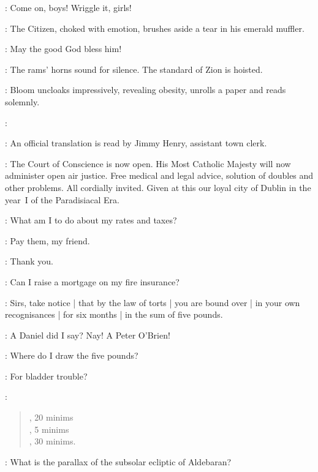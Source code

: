 \Bloom:
Come on,
boys!
Wriggle it,
girls!

:
The Citizen,
choked with emotion,
brushes aside a tear in his emerald muffler.

\Citizen:
May the good God bless him!

:
The rams' horns sound for silence.
The standard of Zion is hoisted.%

:
Bloom uncloaks impressively,
revealing obesity,
unrolls a paper and reads solemnly.

\Bloom:

:
An official translation is read by Jimmy Henry,
assistant town clerk.

\JimmyHenry:
The Court of Conscience is now open.
His Most Catholic Majesty will now administer open air justice.
Free medical and legal advice,
solution of doubles and other problems.
All cordially invited.
Given at this our loyal city of Dublin in the year~I of the Paradisiacal Era.

\PaddyLeonard[1]:
What am I to do about my rates and taxes?

\Bloom:
Pay them,
my friend.

\PaddyLeonard[1]:
Thank you.

\NoseyFlynn[2]:
Can I raise a mortgage on my fire insurance?%

\Bloom:
Sirs,
take notice |
that by the law of torts |
you are bound over |
in your own recognisances |
for six months |
in the sum of five pounds.

\JJOM[1]:
A Daniel did I say?
Nay!
A Peter O'Brien!

\NoseyFlynn[2]:
Where do I draw the five pounds?

\begin{omitted}
\PisserBurke:
For bladder trouble?

\Bloom:
\begin{verse}
, 20 minims\\
, 5 minims\\
, 30 minims.\\
\end{verse}
\end{omitted}

\ChrisCallinan[1]:
What is the parallax of the subsolar ecliptic of Aldebaran?

